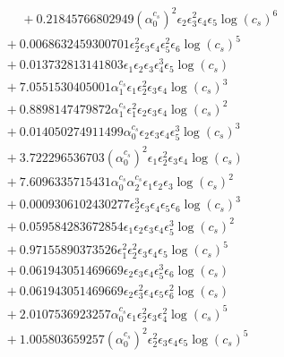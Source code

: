 \documentclass[10pt]{article}
\begin{document}
\begin{align*}
\phantom{F_{s,7}} &\phantom{={}}{}  + 0.21845766802949 \left(\alpha_{0}^{c_s}\right)^{2} \epsilon_{2} \epsilon_{3}^{2} \epsilon_{4} \epsilon_{5} \log{\left(c_{s} \right)}^{6} \\
&{}  + 0.0068632459300701 \epsilon_{2}^{2} \epsilon_{3} \epsilon_{4} \epsilon_{5}^{2} \epsilon_{6} \log{\left(c_{s} \right)}^{5} \\
&{}  + 0.013732813141803 \epsilon_{1} \epsilon_{2} \epsilon_{3} \epsilon_{4}^{3} \epsilon_{5} \log{\left(c_{s} \right)} \\
&{}  + 7.0551530405001 \alpha_{1}^{c_s} \epsilon_{1} \epsilon_{2}^{2} \epsilon_{3} \epsilon_{4} \log{\left(c_{s} \right)}^{3} \\
&{}  + 0.8898147479872 \alpha_{1}^{c_s} \epsilon_{1}^{2} \epsilon_{2} \epsilon_{3} \epsilon_{4} \log{\left(c_{s} \right)}^{2} \\
&{}  + 0.014050274911499 \alpha_{0}^{c_s} \epsilon_{2} \epsilon_{3} \epsilon_{4} \epsilon_{5}^{3} \log{\left(c_{s} \right)}^{3} \\
&{}  + 3.722296536703 \left(\alpha_{0}^{c_s}\right)^{2} \epsilon_{1} \epsilon_{2}^{2} \epsilon_{3} \epsilon_{4} \log{\left(c_{s} \right)} \\
&{}  + 7.6096335715431 \alpha_{0}^{c_s} \alpha_{2}^{c_s} \epsilon_{1} \epsilon_{2} \epsilon_{3} \log{\left(c_{s} \right)}^{2} \\
&{}  + 0.0009306102430277 \epsilon_{2}^{3} \epsilon_{3} \epsilon_{4} \epsilon_{5} \epsilon_{6} \log{\left(c_{s} \right)}^{3} \\
&{}  + 0.059584283672854 \epsilon_{1} \epsilon_{2} \epsilon_{3} \epsilon_{4} \epsilon_{5}^{3} \log{\left(c_{s} \right)}^{2} \\
&{}  + 0.97155890373526 \epsilon_{1}^{2} \epsilon_{2}^{2} \epsilon_{3} \epsilon_{4} \epsilon_{5} \log{\left(c_{s} \right)}^{5} \\
&{}  + 0.061943051469669 \epsilon_{2} \epsilon_{3} \epsilon_{4} \epsilon_{5}^{3} \epsilon_{6} \log{\left(c_{s} \right)} \\
&{}  + 0.061943051469669 \epsilon_{2} \epsilon_{3}^{2} \epsilon_{4} \epsilon_{5} \epsilon_{6}^{2} \log{\left(c_{s} \right)} \\
&{}  + 2.0107536923257 \alpha_{0}^{c_s} \epsilon_{1} \epsilon_{2}^{2} \epsilon_{3} \epsilon_{4}^{2} \log{\left(c_{s} \right)}^{5} \\
&{}  + 1.005803659257 \left(\alpha_{0}^{c_s}\right)^{2} \epsilon_{2}^{2} \epsilon_{3} \epsilon_{4} \epsilon_{5} \log{\left(c_{s} \right)}^{5} \\

\end{align*}
\end{document}
